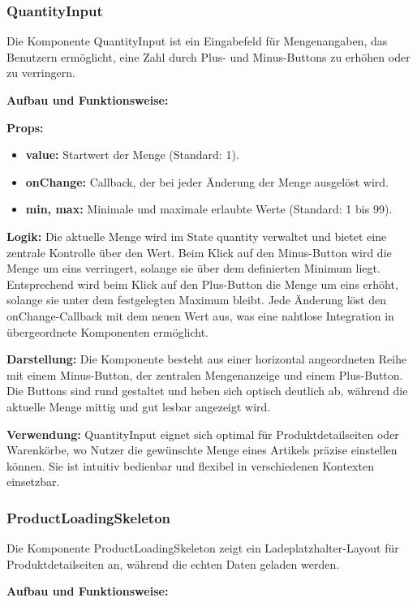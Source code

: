 \documentclass[12pt, a4paper]{report} %
\begin{document}
\subsubsection{QuantityInput}
Die Komponente QuantityInput ist ein Eingabefeld für Mengenangaben, das Benutzern ermöglicht, eine Zahl durch Plus- und Minus-Buttons zu erhöhen oder zu verringern.

\noindent\textbf{Aufbau und Funktionsweise:}

\textbf{Props:}
\begin{itemize}
    \item \textbf{value:} Startwert der Menge (Standard: 1).
    \item \textbf{onChange:} Callback, der bei jeder Änderung der Menge ausgelöst wird.
    \item \textbf{min, max:} Minimale und maximale erlaubte Werte (Standard: 1 bis 99).
\end{itemize}

\textbf{Logik:}
Die aktuelle Menge wird im State quantity verwaltet und bietet eine zentrale Kontrolle über den Wert. Beim Klick auf den Minus-Button wird die Menge um eins verringert, solange sie über dem definierten Minimum liegt. Entsprechend wird beim Klick auf den Plus-Button die Menge um eins erhöht, solange sie unter dem festgelegten Maximum bleibt. Jede Änderung löst den onChange-Callback mit dem neuen Wert aus, was eine nahtlose Integration in übergeordnete Komponenten ermöglicht.

\textbf{Darstellung:}
Die Komponente besteht aus einer horizontal angeordneten Reihe mit einem Minus-Button, der zentralen Mengenanzeige und einem Plus-Button. Die Buttons sind rund gestaltet und heben sich optisch deutlich ab, während die aktuelle Menge mittig und gut lesbar angezeigt wird.

\noindent\textbf{Verwendung:} QuantityInput eignet sich optimal für Produktdetailseiten oder Warenkörbe, wo Nutzer die gewünschte Menge eines Artikels präzise einstellen können. Sie ist intuitiv bedienbar und flexibel in verschiedenen Kontexten einsetzbar.

\subsubsection{ProductLoadingSkeleton}
Die Komponente ProductLoadingSkeleton zeigt ein Ladeplatzhalter-Layout für Produktdetailseiten an, während die echten Daten geladen werden.

\noindent\textbf{Aufbau und Funktionsweise:}
\end{document}
